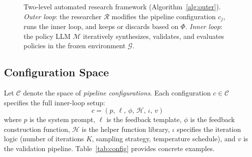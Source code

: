 \documentclass[10pt,twocolumn]{article}
\newcommand{\cR}{\mathcal{R}}
\newcommand{\cM}{\mathcal{M}}
\newcommand{\cG}{\mathcal{G}}
\newcommand{\cC}{\mathcal{C}}
\begin{document}
\begin{figure}[t]
\caption{Two-level automated research framework (Algorithm~\ref{alg:outer}). \emph{Outer loop}: the researcher $\cR$ modifies the pipeline configuration $c_j$, runs the inner loop, and keeps or discards based on $\Phi$. \emph{Inner loop}: the policy LLM $\cM$ iteratively synthesizes, validates, and evaluates policies in the frozen environment $\cG$.}
\label{fig:framework}
\end{figure}

\subsection{Configuration Space}

Let $\cC$ denote the space of \emph{pipeline configurations}. Each configuration $c \in \cC$ specifies the full inner-loop setup:
\begin{equation}
  c = (p,\, \ell,\, \phi,\, \mathcal{H},\, \iota,\, v)
\end{equation}
where $p$ is the system prompt, $\ell$ is the feedback template, $\phi$ is the feedback construction function, $\mathcal{H}$ is the helper function library, $\iota$ specifies the iteration logic (number of iterations $K$, sampling strategy, temperature schedule), and $v$ is the validation pipeline. Table~\ref{tab:config} provides concrete examples.
\end{document}
